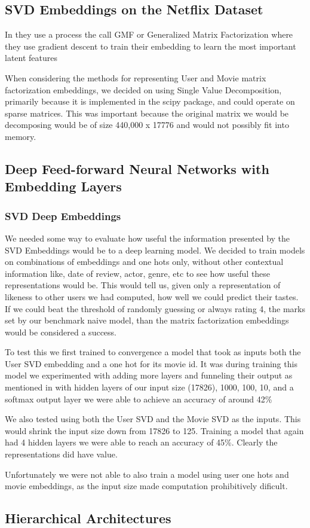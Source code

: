 \subsection{SVD Embeddings on the Netflix Dataset}

In \cite{He2017} they use a process the call GMF or Generalized Matrix Factorization where they use gradient descent to train their embedding to learn the most important latent features

When considering the methods for representing User and Movie matrix factorization embeddings, we decided on using Single Value Decomposition, primarily because it is implemented in the scipy package, and could operate on sparse matrices. This was important because the original matrix we would be decomposing would be of size 440,000 x 17776 and would not possibly fit into memory. 

\subsection{Deep Feed-forward Neural Networks with Embedding Layers}

\subsubsection{SVD Deep Embeddings}
We needed some way to evaluate how useful the information presented by the SVD Embeddings would be to a deep learning model. We decided to train models on combinations of embeddings and one hots only, without other contextual information like, date of review, actor, genre, etc to see how useful these representations would be. This would tell us, given only a representation of likeness to other users we had computed, how well we could predict their tastes. If we could beat the threshold of randomly guessing or always rating 4, the marks set by our benchmark naive model, than the matrix factorization embeddings would be considered a success.

To test this we first trained to convergence a model that took as inputs both the User SVD embedding and a one hot for its movie id. It was during training this model we experimented with adding more layers and funneling their output as mentioned in \cite{He2017} with hidden layers of our input size (17826), 1000, 100, 10, and a softmax output layer we were able to achieve an accuracy of around 42\%

We also tested using both the User SVD and the Movie SVD as the inputs. This would shrink the input size down from 17826 to 125. Training a model that again had 4 hidden layers we were able to reach an accuracy of 45\%. Clearly the representations did have value.

Unfortunately we were not able to also train a model using user one hots and movie embeddings, as the input size made computation prohibitively dificult. 



\subsection{Hierarchical Architectures}
